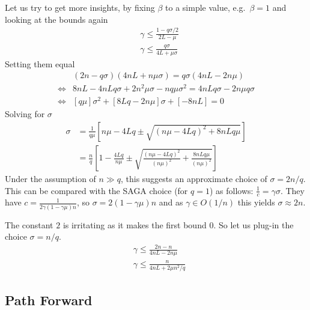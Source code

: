\documentclass{article}
\begin{document}
Let us try to get more insights, by fixing $\beta$ to a simple value, e.g.~$\beta =1$ and looking at the bounds again 
\begin{align}
& \gamma \le \frac{1 -q \sigma/2}{2L -\mu} \\
& \gamma \le  \frac {q \sigma}  {4L + \mu \sigma} 
\end{align}
Setting them equal 
\begin{align}
& (2n -q \sigma)(4nL + n \mu \sigma) = 
q \sigma (4nL - 2n\mu) \\
\iff &  8n L - 4n L q \sigma + 2n^2 \mu \sigma - n q \mu \sigma^2 = 
4n L q\sigma  - 2n \mu q \sigma  \\
\iff & 
\left[ q \mu \right] \sigma ^2 + \left[ 8L q - 2 n\mu \right] \sigma + \left[ - 8nL \right]  = 0 
\end{align}
Solving for $\sigma$
\begin{align}
\sigma 
& = \frac{1}{ q\mu}  \left [ n\mu - 4L q\pm  \sqrt{ (n\mu - 4L q)^2 + 8nLq \mu } \right]  \\
& = \frac{n}{ q}  \left [ 1 - \frac{4Lq}{n\mu}\pm  \sqrt{ \frac{(n\mu - 4L q)^2}{(n\mu)^2} + \frac{8nLq \mu}{ (n \mu)^2}} \right] 
\end{align}
Under the assumption of $n \gg q$, this suggests an approximate choice of $\sigma = 2 n/q$. This can be compared with the SAGA choice (for $q=1$) as follows: $\frac 1c = \gamma \sigma$. They have $c= \frac{1}{2 \gamma (1-\gamma\mu)n}$, so $\sigma = 2 (1-\gamma \mu)n$ and as  $\gamma \in O(1/n)$ this yields $\sigma \approx 2n$. 

The constant $2$ is irritating as it makes the first bound $0$. So let us plug-in the choice $\sigma = n/q$. 
\begin{align}
& \gamma \le \frac{2n -n}{4nL - 2n\mu} \\
& \gamma \le  \frac {n}  {4nL + 2 \mu n^2/q} 
\end{align}




\subsection{Path Forward}
\end{document}
